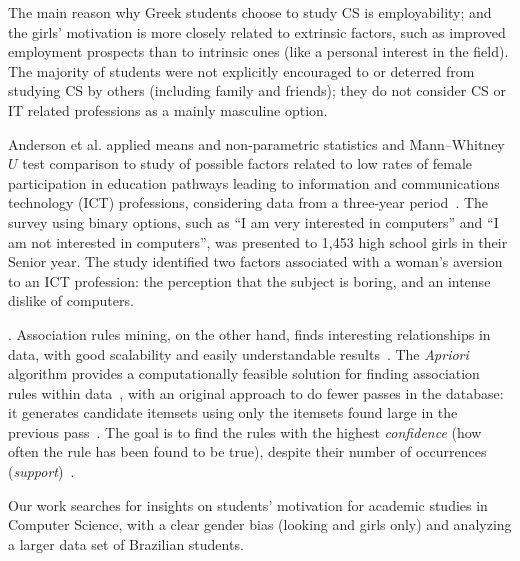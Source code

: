 The main reason why Greek students choose to study CS is employability; and the girls' motivation is more closely related to extrinsic factors, such as improved employment prospects than to intrinsic ones (like a personal interest in the field). The majority of students were not explicitly encouraged to or deterred from studying CS by others (including family and friends); they do not consider CS or IT related professions as a mainly masculine option.

Anderson et al. applied means and non-parametric statistics and Mann–Whitney $U$ test comparison to study of possible factors related to low rates of female participation in education pathways leading to information and communications technology (ICT) professions, considering data from a three-year period~\cite{anderson_because_2008}. The survey using binary options, such as ``I am very interested in computers'' and ``I am not interested in computers'', was presented to 1,453 high school girls in their Senior year. The study identified two factors associated with a woman's aversion to an ICT profession: the perception that the subject is boring, and an intense dislike of computers.

. Association rules mining, on the other hand, finds interesting relationships in data, with good scalability and easily understandable results~\cite{Cios2007}. The \emph{Apriori} algorithm provides a computationally feasible solution for finding association rules within data~\cite{Hastie2009}, with an original approach to do fewer passes in the database: it generates candidate itemsets using only the itemsets found large in the previous pass~\cite{Agrawal1994}. The goal is to find the rules with the highest \emph{confidence} (how often the rule has been found to be true), despite their number of occurrences (\emph{support})~\cite{taniar_exception_2008}.

Our work searches for insights on students' motivation for academic studies in Computer Science, with a clear gender bias (looking and girls only) and analyzing a larger data set of Brazilian students.
